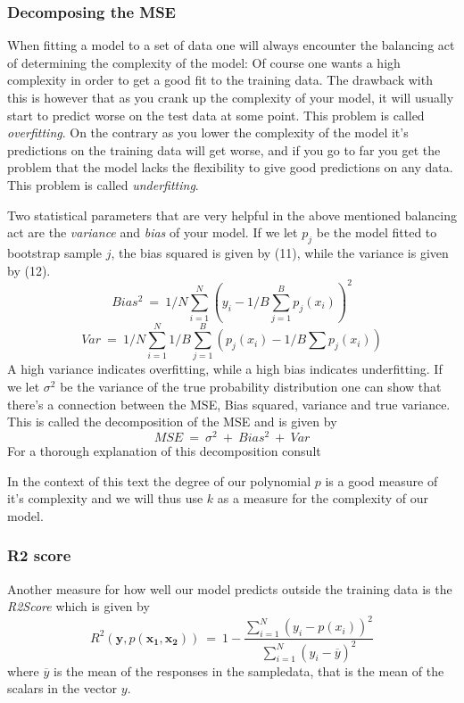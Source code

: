 \documentclass[a4paper,norsk]{article}
\begin{document}
\subsubsection{Decomposing the MSE}
When fitting a model to a set of data one will always encounter 
the balancing act of determining the complexity of the model: Of course
one wants a high complexity in order to get a good fit to the 
training data. The drawback with this is however that as you crank
up the complexity of your model, it will usually
start to predict worse on the test data at some point. 
This problem is called \textit{overfitting}. 
On the contrary as you lower the complexity of the model it's predictions
on the training data will get worse, and if you go to far you get the 
problem that the model lacks the flexibility to give good predictions on 
any data. This problem is called \textit{underfitting}.
\par
Two statistical parameters that are very helpful in the above mentioned 
balancing act are the \textit{variance} and \textit{bias} of your model. 
If we let $p_j$ be the model fitted to bootstrap sample $j$, 
the bias squared is given by (11), while the variance is given by (12).
\begin{equation}
    Bias^2 \ = \ 1/N \sum_{i=1}^N (y_i - 1/B \sum_{j=1}^B p_j(x_i))^2
\end{equation}
\begin{equation}
    Var \ = \ 1/N \sum_{i=1}^N 1/B \sum_{j=1}^B (p_j(x_i) 
    - 1/B \sum p_j(x_i))
\end{equation}
A high variance indicates overfitting, while a high bias indicates
underfitting. If we let $\sigma^2$ be the variance of the true probability
distribution one can show that there's a connection between the MSE,
Bias squared, variance and true variance. This is called the decomposition
of the MSE and is given by
\begin{equation}
    MSE \ = \ \sigma^2 \ + \ Bias^2 \ + \ Var
\end{equation}
For a thorough explanation of this decomposition consult \cite{hastie}
\par
In the context of this text the degree of our polynomial $p$ 
is a good measure of it's complexity and we will thus use 
$k$ as a measure for the complexity of our model.

\subsubsection{R2 score}
Another measure for how well our model predicts outside the training data 
is the \textit{R2Score} which is given by
\begin{equation}
    R^2(\bm{y}, {p(\bm{x_1}, \bm{x_2})}) \ = \
    1 - 
    \frac{\sum_{i=1}^N(y_i-p(x_i))^2}{\sum_{i=1}^N(y_i-\overline{y})^2}
\end{equation}
where $\overline{y}$ is the mean of the responses in the sampledata, that 
is the mean of the scalars in the vector $\bm{}y$.
\end{document}
